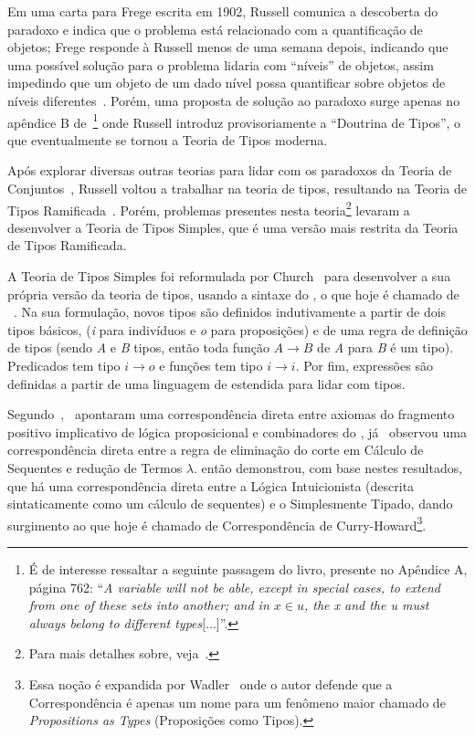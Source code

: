 		Em uma carta para Frege escrita em 1902, Russell comunica a descoberta do paradoxo e indica que o problema está relacionado com a quantificação
		de objetos; Frege responde à Russell menos de uma semana depois, indicando que uma possível solução para o problema lidaria com ``níveis'' de objetos,
		assim impedindo que um objeto de um dado nível possa quantificar sobre objetos de níveis diferentes~\cite{van2002frege}. Porém, uma proposta de solução ao paradoxo
		surge apenas no apêndice B de~\footnote{É de interesse ressaltar a seguinte passagem do livro, presente no Apêndice A,
		página 762: ``\textit{A variable will not be able, except in special cases, to extend from one of these sets into another; and in \(x \in u\), the
		x and the u must always belong to different types}[...]''.} onde Russell introduz provisoriamente a ``Doutrina de Tipos'',
		o que eventualmente se tornou a Teoria de Tipos moderna.

		Após explorar diversas outras teorias para lidar com os paradoxos da Teoria de Conjuntos~\cite{van2002frege}, Russell voltou a trabalhar
		na teoria de tipos, resultando na Teoria de Tipos Ramificada~\cite{russell1908mathematical}. Porém, problemas presentes nesta
		teoria\footnote{Para mais detalhes sobre, veja~\cite[p. 150-153]{van2002frege}.} levaram  a desenvolver
		a Teoria de Tipos Simples, que é uma versão mais restrita da Teoria de Tipos Ramificada.

		A Teoria de Tipos Simples foi reformulada por Church~\cite{church1940formulation} para desenvolver a sua própria versão da teoria de
		tipos, usando a sintaxe do \CalcLambda, o que hoje é chamado de \CLST~\cite{huet1990logical}. Na sua formulação, novos tipos
		são definidos indutivamente a partir de dois tipos básicos, (\textit{i} para indivíduos e \textit{o} para proposições) e de uma regra
		de definição de tipos (sendo \textit{A} e \textit{B} tipos, então toda função \(A \to B\) de \textit{A} para \textit{B} é um tipo).
		Predicados tem tipo \(i \to o\) e funções tem tipo \(i \to i\). Por fim, expressões são definidas a partir de uma linguagem de \CalcLambda estendida para
		lidar com tipos.

		Segundo~,~ apontaram uma correspondência direta entre axiomas do fragmento positivo implicativo
		de lógica proposicional e combinadores do \CalcLambda, já~ observou uma correspondência direta entre a regra de eliminação do corte
		em Cálculo de Sequentes e redução de Termos \(\lambda\).  então demonstrou, com base nestes resultados, que há uma
		correspondência direta entre a Lógica Intuicionista (descrita sintaticamente como um cálculo de sequentes) e o \CalcLambda Simplesmente Tipado,
		dando surgimento ao que hoje é chamado de Correspondência de Curry-Howard\footnote{Essa noção é expandida por Wadler~\cite{wadler2015propositions}
		onde o autor defende que a Correspondência é apenas um nome para um fenômeno maior chamado de \textit{Propositions as Types}
		(Proposições como Tipos).}.

